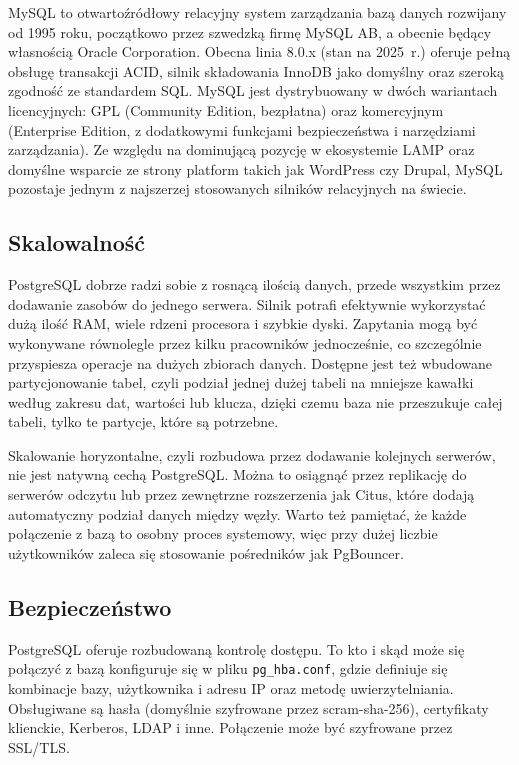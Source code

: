 MySQL to otwartoźródłowy relacyjny system zarządzania bazą danych rozwijany
od 1995 roku, początkowo przez szwedzką firmę MySQL AB, a obecnie będący
własnością Oracle Corporation. Obecna linia 8.0.x (stan na 2025~r.) oferuje
pełną obsługę transakcji ACID, silnik składowania InnoDB jako domyślny oraz
szeroką zgodność ze standardem SQL. MySQL jest dystrybuowany w dwóch wariantach
licencyjnych: GPL (Community Edition, bezpłatna) oraz komercyjnym (Enterprise
Edition, z dodatkowymi funkcjami bezpieczeństwa i narzędziami zarządzania).
Ze względu na dominującą pozycję w ekosystemie LAMP oraz domyślne wsparcie
ze strony platform takich jak WordPress czy Drupal, MySQL pozostaje jednym
z najszerzej stosowanych silników relacyjnych na świecie.

\subsection{Skalowalność}

PostgreSQL dobrze radzi sobie z rosnącą ilością danych, przede wszystkim przez
dodawanie zasobów do jednego serwera. Silnik potrafi efektywnie wykorzystać
dużą ilość RAM, wiele rdzeni procesora i szybkie dyski. Zapytania mogą być
wykonywane równolegle przez kilku pracowników jednocześnie, co szczególnie
przyspiesza operacje na dużych zbiorach danych. Dostępne jest też wbudowane
partycjonowanie tabel, czyli podział jednej dużej tabeli na mniejsze kawałki
według zakresu dat, wartości lub klucza, dzięki czemu baza nie przeszukuje
całej tabeli, tylko te partycje, które są potrzebne.

Skalowanie horyzontalne, czyli rozbudowa przez dodawanie kolejnych serwerów,
nie jest natywną cechą PostgreSQL. Można to osiągnąć przez replikację do
serwerów odczytu lub przez zewnętrzne rozszerzenia jak Citus, które dodają
automatyczny podział danych między węzły. Warto też pamiętać, że każde
połączenie z bazą to osobny proces systemowy, więc przy dużej liczbie
użytkowników zaleca się stosowanie pośredników jak PgBouncer.

\subsection{Bezpieczeństwo}

PostgreSQL oferuje rozbudowaną kontrolę dostępu. To kto i skąd może się
połączyć z bazą konfiguruje się w pliku \texttt{pg\_hba.conf}, gdzie definiuje
się kombinacje bazy, użytkownika i adresu IP oraz metodę uwierzytelniania.
Obsługiwane są hasła (domyślnie szyfrowane przez scram-sha-256), certyfikaty
klienckie, Kerberos, LDAP i inne. Połączenie może być szyfrowane przez SSL/TLS.

